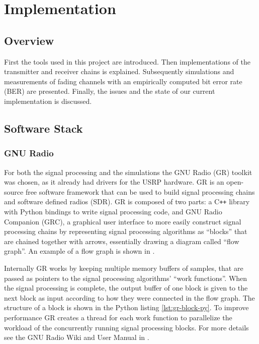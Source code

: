 
\chapter{Implementation} \label{chp:implementation}

\section{Overview}

First the tools used in this project are introduced. Then implementations of the transmitter and receiver chains is explained. Subsequently simulations and measurements of fading channels with an empirically computed bit error rate (BER) are presented. Finally, the issues and the state of our current implementation is discussed.

\section{Software Stack}

\subsection{GNU Radio}

For both the signal processing and the simulations the GNU Radio (GR) toolkit was chosen, as it already had drivers for the USRP hardware. GR is an open-source free software framework that can be used to build signal processing chains and software defined radios (SDR). GR is composed of two parts: a C\texttt{++} library with Python bindings to write signal processing code, and GNU Radio Companion (GRC), a graphical user interface to more easily construct signal processing chains by representing signal processing algorithms as ``blocks'' that are chained together with arrows, essentially drawing a diagram called ``flow graph''. An example of a flow graph is shown in .

Internally GR works by keeping multiple memory buffers of samples, that are passed as pointers to the signal processing algorithms' ``work functions''. When the signal processing is complete, the output buffer of one block is given to the next block as input according to how they were connected in the flow graph. The structure of a block is shown in the Python listing \ref{lst:gr-block-py}. To improve performance GR creates a thread for each work function to parallelize the workload of the concurrently running signal processing blocks. For more details see the GNU Radio Wiki and User Manual in \cite{GRWiki}.

